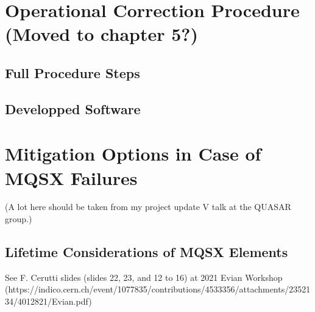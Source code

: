



\section{Operational Correction Procedure (Moved to chapter 5?)}

\subsection{Full Procedure Steps}

\subsection{Developped Software}


\section{Mitigation Options in Case of MQSX Failures}

(A lot here should be taken from my project update V talk at the QUASAR group.)

\subsection{Lifetime Considerations of MQSX Elements}

See F. Cerutti slides (slides 22, 23, and 12 to 16) at 2021 Evian Workshop
(https://indico.cern.ch/event/1077835/contributions/4533356/attachments/2352134/4012821/Evian.pdf)


